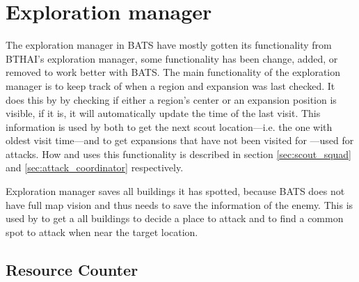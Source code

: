 \section{Exploration manager}
\label{sec:exploration_manager}
The exploration manager in BATS have mostly gotten its functionality from BTHAI’s exploration manager, some functionality has been change, added, or removed to work better with BATS. The main functionality of the exploration manager is to keep track of when a region and expansion was last checked. It does this by by checking if either a region’s center or an expansion position is visible, if it is, it will automatically update the time of the last visit. This information is used by both  to get the next scout location—i.e. the one with oldest visit time—and  to get expansions that have not been visited for \attackCoordinatorExpansionNotCheckedTime—used for attacks. How  and  uses this functionality is described in section \ref{sec:scout_squad} and \ref{sec:attack_coordinator} respectively.

Exploration manager saves all buildings it has spotted, because BATS does not have full map vision and thus needs to save the information of the enemy. This is used by  to get a all buildings to decide a place to attack and  to find a common spot to attack when near the target location.

\subsection{Resource Counter}
\label{sec:resource_counter}